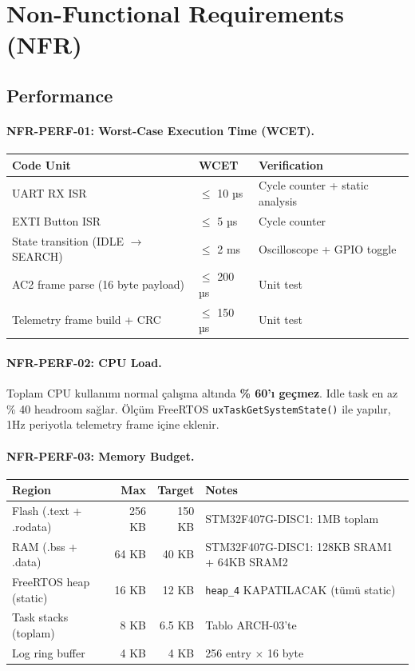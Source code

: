 \section{Non-Functional Requirements (NFR)}

\subsection{Performance}

\paragraph{NFR-PERF-01: Worst-Case Execution Time (WCET).}
\begin{tabularx}{\textwidth}{|l|l|X|}
\hline
\textbf{Code Unit} & \textbf{WCET} & \textbf{Verification} \\
\hline
UART RX ISR & $\leq$ 10 µs & Cycle counter + static analysis \\
EXTI Button ISR & $\leq$ 5 µs & Cycle counter \\
State transition (IDLE $\rightarrow$ SEARCH) & $\leq$ 2 ms & Oscilloscope + GPIO toggle \\
AC2 frame parse (16 byte payload) & $\leq$ 200 µs & Unit test \\
Telemetry frame build + CRC & $\leq$ 150 µs & Unit test \\
\hline
\end{tabularx}

\paragraph{NFR-PERF-02: CPU Load.}
Toplam CPU kullanımı normal çalışma altında \textbf{\% 60'ı geçmez}. Idle task en az \% 40 headroom sağlar. Ölçüm FreeRTOS \texttt{uxTaskGetSystemState()} ile yapılır, 1Hz periyotla telemetry frame içine eklenir.

\paragraph{NFR-PERF-03: Memory Budget.}
\begin{tabularx}{\textwidth}{|l|r|r|X|}
\hline
\textbf{Region} & \textbf{Max} & \textbf{Target} & \textbf{Notes} \\
\hline
Flash (.text + .rodata) & 256 KB & 150 KB & STM32F407G-DISC1: 1MB toplam \\
RAM (.bss + .data)      & 64 KB  & 40 KB  & STM32F407G-DISC1: 128KB SRAM1 + 64KB SRAM2 \\
FreeRTOS heap (static)  & 16 KB  & 12 KB  & \texttt{heap\_4} KAPATILACAK (tümü static) \\
Task stacks (toplam)    & 8 KB   & 6.5 KB & Tablo ARCH-03'te \\
Log ring buffer         & 4 KB   & 4 KB   & 256 entry $\times$ 16 byte \\
\hline
\end{tabularx}

